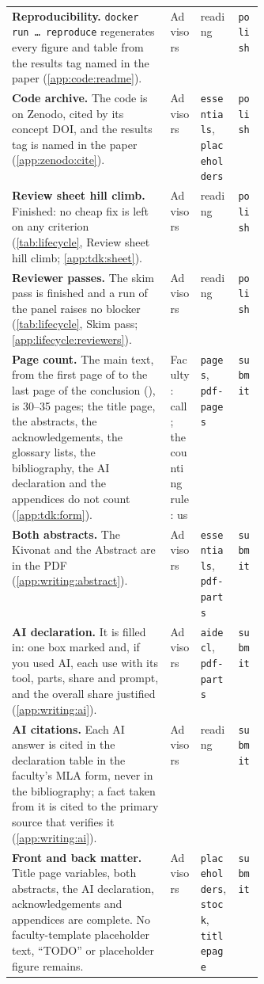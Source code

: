 {\begin{xltabular}{\linewidth}{X >{\raggedright\arraybackslash}p{0.12\linewidth} >{\raggedright\arraybackslash}p{0.15\linewidth} >{\raggedright\arraybackslash}p{0.1\linewidth}}
  \textbf{Reproducibility.} \texttt{docker run \dots{} reproduce} regenerates every figure and table from the results tag named in the paper (\cref{app:code:readme}). & Advisors & reading & \texttt{polish} \\
  \textbf{Code archive.} The code is on Zenodo, cited by its concept DOI, and the results tag is named in the paper (\cref{app:zenodo:cite}). & Advisors & \texttt{essentials}, \texttt{placeholders} & \texttt{polish} \\
  \textbf{Review sheet hill climb.} Finished: no cheap fix is left on any criterion (\cref{tab:lifecycle}, Review sheet hill climb; \cref{app:tdk:sheet}). & Advisors & reading & \texttt{polish} \\
  \textbf{Reviewer passes.} The skim pass is finished and a run of the panel raises no blocker (\cref{tab:lifecycle}, Skim pass; \cref{app:lifecycle:reviewers}). & Advisors & reading & \texttt{polish} \\
  \textbf{Page count.} The main text, from the first page of  to the last page of the conclusion (), is 30--35 pages; the title page, the abstracts, the acknowledgements, the glossary lists, the bibliography, the AI declaration and the appendices do not count (\cref{app:tdk:form}). & Faculty: call; the counting rule: us & \texttt{pages}, \texttt{pdf-pages} & \texttt{submit} \\
  \textbf{Both abstracts.} The Kivonat and the Abstract are in the PDF (\cref{app:writing:abstract}). & Advisors & \texttt{essentials}, \texttt{pdf-parts} & \texttt{submit} \\
  \textbf{AI declaration.} It is filled in: one box marked and, if you used AI, each use with its tool, parts, share and prompt, and the overall share justified (\cref{app:writing:ai}). & Advisors & \texttt{aidecl}, \texttt{pdf-parts} & \texttt{submit} \\
  \textbf{AI citations.} Each AI answer is cited in the declaration table in the faculty's MLA form, never in the bibliography; a fact taken from it is cited to the primary source that verifies it (\cref{app:writing:ai}). & Advisors & reading & \texttt{submit} \\
  \textbf{Front and back matter.} Title page variables, both abstracts, the AI declaration, acknowledgements and appendices are complete. No faculty-template placeholder text, \enquote{TODO} or placeholder figure remains. & Advisors & \texttt{placeholders}, \texttt{stock}, \texttt{titlepage} & \texttt{submit} \\

\end{xltabular}}
